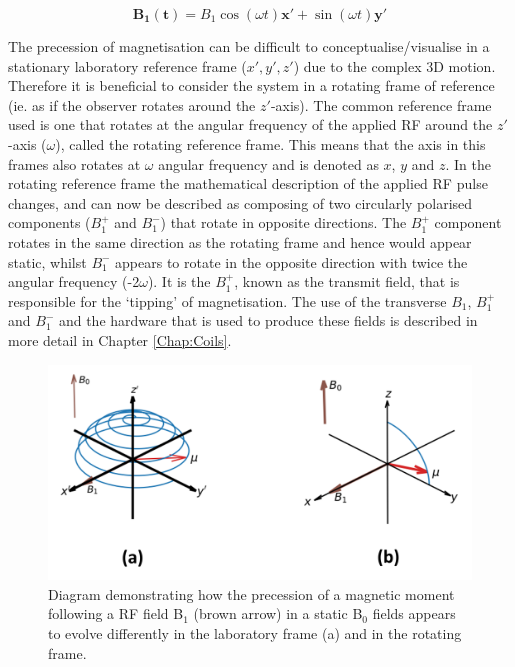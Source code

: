 \begin{equation}
    \mathbf{B_1(t)} = B_1\cos(\omega t)\mathbf{x'} + \sin(\omega t)\mathbf{y'}
\end{equation}

The precession of magnetisation can be difficult to conceptualise/visualise in a stationary laboratory reference frame ($x',y',z'$) due to the complex 3D motion. Therefore it is beneficial to consider the system in a rotating frame of reference (ie. as if the observer rotates around the $z'$-axis). The common reference frame used is one that rotates at the angular frequency of the applied \ac{RF} around the $z'$-axis ($\omega$), called the rotating reference frame. This means that the axis in this frames also rotates at $\omega$ angular frequency and is denoted as $x$, $y$ and $z$. In the rotating reference frame the mathematical description of the applied \ac{RF} pulse changes, and can now be described as composing of two circularly polarised components ($B_1^+$ and $B_1^-$) that rotate in opposite directions. The $B_1^+$ component rotates in the same direction as the rotating frame and hence would appear static, whilst $B_1^-$ appears to rotate in the opposite direction with twice the angular frequency (-2$\omega$). It is the $B_1^+$, known as the transmit field, that is responsible for the `tipping' of magnetisation. The use of the transverse $B_1$, $B_1^+$ and $B_1^-$ and the hardware that is used to produce these fields is described in more detail in Chapter \ref{Chap:Coils}.

\begin{figure}
    \centering
    \includegraphics[width=0.9\linewidth]{Figures/Theory/Frames.png}
    \caption{Diagram demonstrating how the precession of a magnetic moment following a \ac{RF} field B$_1$ (brown arrow) in a static B$_0$ fields appears to evolve differently in the laboratory frame (a) and in the rotating frame.}
    \label{fig:theory:frames}
\end{figure}

